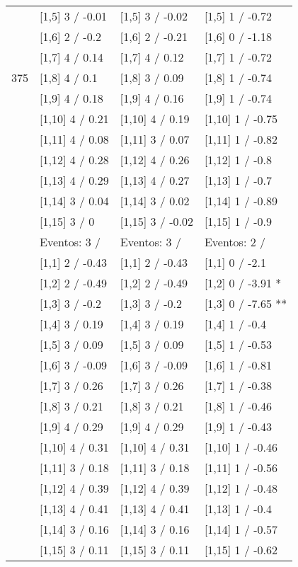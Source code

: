 \begin{table}
\begin{tabular}[t]{llll}
 & {}[1,5] 3  / -0.01 & {}[1,5] 3  / -0.02 & {}[1,5] 1  / -0.72\\
 & {}[1,6] 2  / -0.2 & {}[1,6] 2  / -0.21 & {}[1,6] 0  / -1.18\\
 & {}[1,7] 4  / 0.14 & {}[1,7] 4  / 0.12 & {}[1,7] 1  / -0.72\\
375 & {}[1,8] 4  / 0.1 & {}[1,8] 3  / 0.09 & {}[1,8] 1  / -0.74\\
\addlinespace
 & {}[1,9] 4  / 0.18 & {}[1,9] 4  / 0.16 & {}[1,9] 1  / -0.74\\
 & {}[1,10] 4  / 0.21 & {}[1,10] 4  / 0.19 & {}[1,10] 1  / -0.75\\
 & {}[1,11] 4  / 0.08 & {}[1,11] 3  / 0.07 & {}[1,11] 1  / -0.82\\
 & {}[1,12] 4  / 0.28 & {}[1,12] 4  / 0.26 & {}[1,12] 1  / -0.8\\
 & {}[1,13] 4  / 0.29 & {}[1,13] 4  / 0.27 & {}[1,13] 1  / -0.7\\
\addlinespace
 & {}[1,14] 3  / 0.04 & {}[1,14] 3  / 0.02 & {}[1,14] 1  / -0.89\\
 & {}[1,15] 3  / 0 & {}[1,15] 3  / -0.02 & {}[1,15] 1  / -0.9\\
 & Eventos:  3 / & Eventos:  3 / & Eventos:  2 /\\
 & {}[1,1] 2  / -0.43 & {}[1,1] 2  / -0.43 & {}[1,1] 0  / -2.1\\
 & {}[1,2] 2  / -0.49 & {}[1,2] 2  / -0.49 & {}[1,2] 0  / -3.91 *\\
\addlinespace
 & {}[1,3] 3  / -0.2 & {}[1,3] 3  / -0.2 & {}[1,3] 0  / -7.65 **\\
 & {}[1,4] 3  / 0.19 & {}[1,4] 3  / 0.19 & {}[1,4] 1  / -0.4\\
 & {}[1,5] 3  / 0.09 & {}[1,5] 3  / 0.09 & {}[1,5] 1  / -0.53\\
 & {}[1,6] 3  / -0.09 & {}[1,6] 3  / -0.09 & {}[1,6] 1  / -0.81\\
 & {}[1,7] 3  / 0.26 & {}[1,7] 3  / 0.26 & {}[1,7] 1  / -0.38\\
\addlinespace
500 & {}[1,8] 3  / 0.21 & {}[1,8] 3  / 0.21 & {}[1,8] 1  / -0.46\\
 & {}[1,9] 4  / 0.29 & {}[1,9] 4  / 0.29 & {}[1,9] 1  / -0.43\\
 & {}[1,10] 4  / 0.31 & {}[1,10] 4  / 0.31 & {}[1,10] 1  / -0.46\\
 & {}[1,11] 3  / 0.18 & {}[1,11] 3  / 0.18 & {}[1,11] 1  / -0.56\\
 & {}[1,12] 4  / 0.39 & {}[1,12] 4  / 0.39 & {}[1,12] 1  / -0.48\\
\addlinespace
 & {}[1,13] 4  / 0.41 & {}[1,13] 4  / 0.41 & {}[1,13] 1  / -0.4\\
 & {}[1,14] 3  / 0.16 & {}[1,14] 3  / 0.16 & {}[1,14] 1  / -0.57\\
 & {}[1,15] 3  / 0.11 & {}[1,15] 3  / 0.11 & {}[1,15] 1  / -0.62\\
\bottomrule
\end{tabular}
\end{table}
